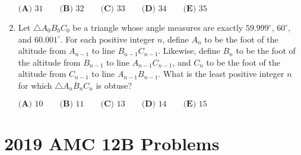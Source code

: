 \documentclass{article}
\begin{document}
\begin{enumerate}[label=\arabic*., itemsep=0.5em]
\(\textbf{(A) } 31 \qquad \textbf{(B) } 32 \qquad \textbf{(C) } 33 \qquad \textbf{(D) } 34 \qquad \textbf{(E) } 35\)\par \vspace{0.5em}\item Let \(\triangle A_0B_0C_0\) be a triangle whose angle measures are exactly \(59.999^\circ\), \(60^\circ\), and \(60.001^\circ\). For each positive integer \(n\), define \(A_n\) to be the foot of the altitude from \(A_{n-1}\) to line \(B_{n-1}C_{n-1}\). Likewise, define \(B_n\) to be the foot of the altitude from \(B_{n-1}\) to line \(A_{n-1}C_{n-1}\), and \(C_n\) to be the foot of the altitude from \(C_{n-1}\) to line \(A_{n-1}B_{n-1}\). What is the least positive integer \(n\) for which \(\triangle A_nB_nC_n\) is obtuse?

\(\textbf{(A) } 10 \qquad \textbf{(B) }11 \qquad \textbf{(C) } 13\qquad \textbf{(D) } 14 \qquad \textbf{(E) } 15\)\par \vspace{0.5em}\end{enumerate}\newpage\section*{2019 AMC 12B Problems}
\end{document}
